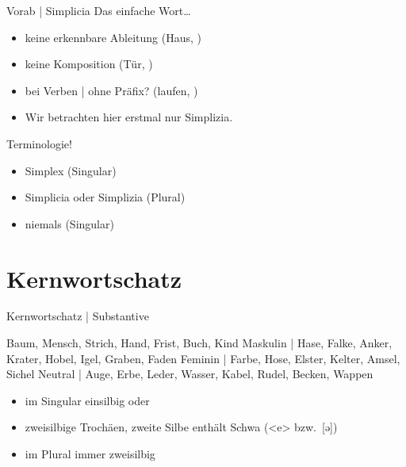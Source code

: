 \begin{frame}
  {Vorab | Simplicia}
  \onslide<+->
  \onslide<+->
  Das \alert{einfache} Wort…\\
  \Halbzeile
  \begin{itemize}[<+->]
    \item keine erkennbare Ableitung (\alert{Haus}, )
    \item keine Komposition (\alert{Tür}, )
    \item bei Verben | ohne Präfix? (\alert{laufen}, )
      \Halbzeile
    \item \alert{Wir betrachten hier erstmal nur Simplizia.}
  \end{itemize}
      \Zeile
      \onslide<+->
   Terminologie!\\
  \Halbzeile
  \begin{itemize}[<+->]
    \item \alert{Simplex} (Singular)
    \item \alert{Simplicia} oder \alert{Simplizia} (Plural)
      \Halbzeile
    \item niemals  (Singular)
  \end{itemize}
\end{frame}

\section{Kernwortschatz}

\begin{frame}
  {Kernwortschatz | Substantive}
  \onslide<+->
  \onslide<+->
  \begin{exe}
    \ex Baum, Mensch, Strich, Hand, Frist, Buch, Kind
    \Halbzeile
    \onslide<+->
    \ex \alert{Maskulin} | Hase, Falke, Anker, Krater, Hobel, Igel, Graben, Faden
    \onslide<+->
    \ex \alert{Feminin} | Farbe, Hose, Elster, Kelter, Amsel, Sichel
    \onslide<+->
    \ex \alert{Neutral} | Auge, Erbe, Leder, Wasser, Kabel, Rudel, Becken, Wappen
  \end{exe}
  \onslide<+->
  \Zeile
  \begin{itemize}[<+->]
    \item im Singular einsilbig oder
    \item zweisilbige Trochäen, zweite Silbe enthält \alert{Schwa} (<e> bzw.\ [ə])
      \Halbzeile
    \item im Plural immer zweisilbig
  \end{itemize}
\end{frame}

